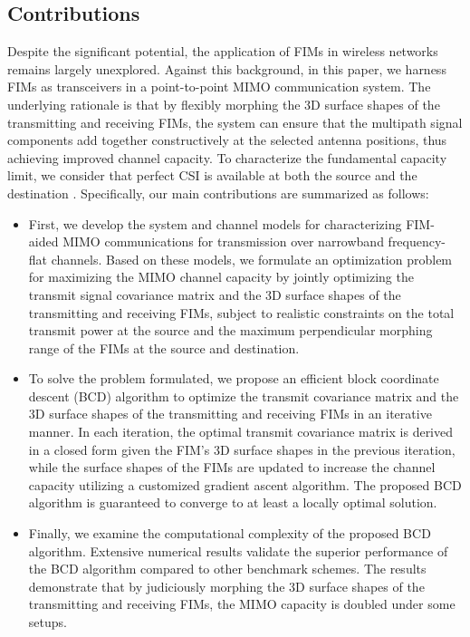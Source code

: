 \documentclass[lettersize,journal]{IEEEtran}
\begin{document}
\subsection{Contributions}
Despite the significant potential, the application of FIMs in wireless networks remains largely unexplored. Against this background, in this paper, we harness FIMs as transceivers in a point-to-point MIMO communication system. The underlying rationale is that by flexibly morphing the 3D surface shapes of the transmitting and receiving FIMs, the system can ensure that the multipath signal components add together constructively at the selected antenna positions, thus achieving improved channel capacity. To characterize the fundamental capacity limit, we consider that perfect CSI is available at both the source and the destination \cite{TWC_2023_Ma_MIMO, JSAC_2023_An_Stacked}. Specifically, our main contributions are summarized as follows:
\begin{itemize}
\item First, we develop the system and channel models for characterizing FIM-aided MIMO communications for transmission over narrowband frequency-flat channels. Based on these models, we formulate an optimization problem for maximizing the MIMO channel capacity by jointly optimizing the transmit signal covariance matrix and the 3D surface shapes of the transmitting and receiving FIMs, subject to realistic constraints on the total transmit power at the source and the maximum perpendicular morphing range of the FIMs at the source and destination.
\item To solve the problem formulated, we propose an efficient block coordinate descent (BCD) algorithm to optimize the transmit covariance matrix and the 3D surface shapes of the transmitting and receiving FIMs in an iterative manner. In each iteration, the optimal transmit covariance matrix is derived in a closed form given the FIM's 3D surface shapes in the previous iteration, while the surface shapes of the FIMs are updated to increase the channel capacity utilizing a customized gradient ascent algorithm. The proposed BCD algorithm is guaranteed to converge to at least a locally optimal solution.
\item Finally, we examine the computational complexity of the proposed BCD algorithm. Extensive numerical results validate the superior performance of the BCD algorithm compared to other benchmark schemes. The results demonstrate that by judiciously morphing the 3D surface shapes of the transmitting and receiving FIMs, the MIMO capacity is doubled under some setups.
\end{itemize}
\end{document}
